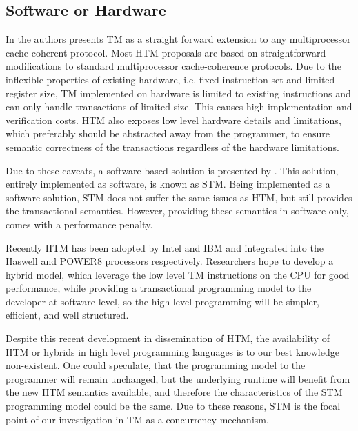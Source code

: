 \subsection{Software or Hardware}
In \cite{herlihy1993transactional} the authors presents \ac{TM} as a straight forward extension to any multiprocessor cache-coherent protocol. Most \ac{HTM} proposals are based on straightforward modifications to standard multiprocessor cache-coherence protocols\cite{herlihy2011tm}. Due to the inflexible properties of existing hardware, i.e. fixed instruction set and limited register size, \ac{TM} implemented on hardware is limited to existing instructions and can only handle transactions of limited size\cite{dragojevic2011stm}. This causes high implementation and verification costs\cite{cascaval2008software}. \ac{HTM} also exposes low level hardware details and limitations\cite{herlihy2011tm}, which preferably should be abstracted away from the programmer, to ensure semantic correctness of the transactions regardless of the hardware limitations. 

Due to these caveats, a software based solution is presented by \cite{shavit1997software}. This solution, entirely implemented as software, is known as \acl{STM}. Being implemented as a software solution, \ac{STM} does not suffer the same issues as \ac{HTM}, but still provides the transactional semantics. However, providing these semantics in software only, comes with a performance penalty\cite{cascaval2008software}\cite{dragojevic2011stm}.

Recently \ac{HTM} has been adopted by Intel and IBM and integrated into the Haswell and POWER8 processors respectively\cite{Anthes:2014:RSP:2684442.2667109}. Researchers hope to develop a hybrid model, which leverage the low level \ac{TM} instructions on the \ac{CPU} for good performance, while providing a transactional programming model to the developer at software level, so the high level programming will be simpler, efficient, and well structured\cite{Anthes:2014:RSP:2684442.2667109}.

Despite this recent development in dissemination of \ac{HTM}, the availability of \ac{HTM} or hybrids in high level programming languages is to our best knowledge non-existent. One could speculate, that the programming model to the programmer will remain unchanged, but the underlying runtime will benefit from the new \ac{HTM} semantics available, and therefore the characteristics of the \ac{STM} programming model could be the same. Due to these reasons, \ac{STM} is the focal point of our investigation in \ac{TM} as a concurrency mechanism. 

